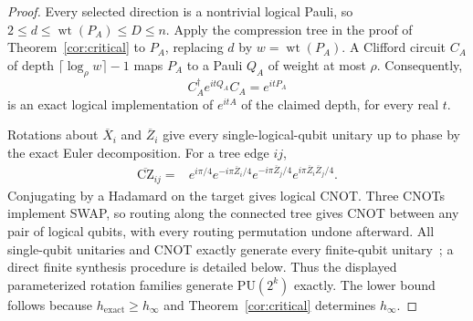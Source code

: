 \documentclass[aps,prl,reprint,notitlepage,nofootinbib,nobibnotes]{revtex4-2}
\newcommand{\PU}{\mathrm{PU}}
\begin{document}
\begin{proof}
Every selected direction is a nontrivial logical Pauli, so \(2\le d\le\operatorname{wt}(P_A)\le D\le n\). Apply the compression tree in the proof of Theorem~\ref{cor:critical} to \(P_A\), replacing \(d\) by \(w=\operatorname{wt}(P_A)\). A Clifford circuit \(C_A\) of depth \(\lceil\log_\rho w\rceil-1\) maps \(P_A\) to a Pauli \(Q_A\) of weight at most \(\rho\). Consequently,
\[
 C_A^\dagger e^{itQ_A}C_A=e^{itP_A}
\]
is an exact logical implementation of \(e^{itA}\) of the claimed depth, for every real \(t\).

Rotations about \(\overline X_i\) and \(\overline Z_i\) give every single-logical-qubit unitary up to phase by the exact Euler decomposition. For a tree edge \(ij\),
\begin{align}
 \overline{\mathrm{CZ}}_{ij}
 ={}&e^{i\pi/4}
 e^{-i\pi\overline Z_i/4}
 e^{-i\pi\overline Z_j/4}
 e^{i\pi\overline Z_i\overline Z_j/4}.
 \label{eq:exact-cz}
\end{align}
Conjugating by a Hadamard on the target gives logical CNOT. Three CNOTs implement SWAP, so routing along the connected tree gives CNOT between any pair of logical qubits, with every routing permutation undone afterward. All single-qubit unitaries and CNOT exactly generate every finite-qubit unitary~\cite{Barenco,Shende}; a direct finite synthesis procedure is detailed below. Thus the displayed parameterized rotation families generate \(\PU(2^k)\) exactly. The lower bound follows because \(h_{\mathrm{exact}}\ge h_\infty\) and Theorem~\ref{cor:critical} determines \(h_\infty\).
\end{proof}
\end{document}
